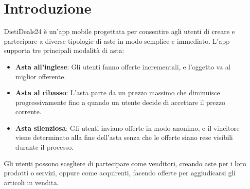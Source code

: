 \chapter{Introduzione}
\noindent DietiDeals24 è un'app mobile progettata per consentire agli utenti di creare e partecipare a diverse tipologie di aste in modo semplice e immediato. L'app supporta tre principali modalità di asta:

\begin{itemize}
    \item \textbf{Asta all'inglese}: Gli utenti fanno offerte incrementali, e l'oggetto va al miglior offerente.
    \item \textbf{Asta al ribasso}: L'asta parte da un prezzo massimo che diminuisce progressivamente fino a quando un utente decide di accettare il prezzo corrente.
    \item \textbf{Asta silenziosa}: Gli utenti inviano offerte in modo anonimo, e il vincitore viene determinato alla fine dell'asta senza che le offerte siano rese visibili durante il processo.
\end{itemize}

\noindent Gli utenti possono scegliere di partecipare come venditori, creando aste per i loro prodotti o servizi, oppure come acquirenti, facendo offerte per aggiudicarsi gli articoli in vendita. 
